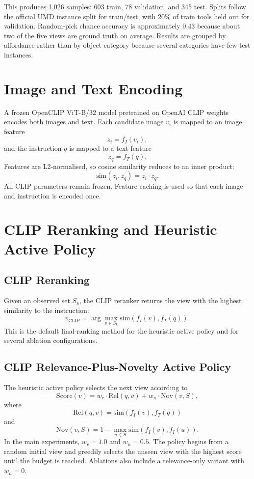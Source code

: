 This produces 1{,}026 samples: 603 train, 78 validation, and 345 test. Splits follow the official UMD instance split for train/test, with 20\% of train tools held out for validation. Random-pick chance accuracy is approximately 0.43 because about two of the five views are ground truth on average. Results are grouped by affordance rather than by object category because several categories have few test instances.

\section{Image and Text Encoding}

A frozen OpenCLIP ViT-B/32 model pretrained on OpenAI CLIP weights encodes both images and text. Each candidate image \(v_i\) is mapped to an image feature
\[
z_i = f_I(v_i),
\]
and the instruction \(q\) is mapped to a text feature
\[
z_q = f_T(q).
\]
Features are L2-normalised, so cosine similarity reduces to an inner product:
\[
\mathrm{sim}(z_i, z_q) = z_i \cdot z_q.
\]
All CLIP parameters remain frozen. Feature caching is used so that each image and instruction is encoded once.

\section{CLIP Reranking and Heuristic Active Policy}

\subsection{CLIP Reranking}

Given an observed set \(S_k\), the CLIP reranker returns the view with the highest similarity to the instruction:
\[
\hat{v}_{\mathrm{CLIP}} = \arg\max_{v \in S_k} \mathrm{sim}(f_I(v), f_T(q)).
\]
This is the default final-ranking method for the heuristic active policy and for several ablation configurations.

\subsection{CLIP Relevance-Plus-Novelty Active Policy}

The heuristic active policy selects the next view according to
\[
\mathrm{Score}(v) = w_r \cdot \mathrm{Rel}(q, v) + w_n \cdot \mathrm{Nov}(v, S),
\]
where
\[
\mathrm{Rel}(q, v) = \mathrm{sim}(f_I(v), f_T(q))
\]
and
\[
\mathrm{Nov}(v, S) = 1 - \max_{u \in S} \mathrm{sim}(f_I(v), f_I(u)).
\]
In the main experiments, \(w_r = 1.0\) and \(w_n = 0.5\). The policy begins from a random initial view and greedily selects the unseen view with the highest score until the budget is reached. Ablations also include a relevance-only variant with \(w_n = 0\).

